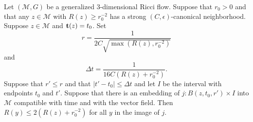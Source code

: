 \begin{lemma}
\label{lem:curvature-control-canonical-nbhd}
\label{controlnbhd}
Let $({\mathcal M},G)$ be a generalized $3$-dimensional Ricci flow.
Suppose that $r_0>0$ and that any $z\in {\mathcal M}$ with $R(z)\ge
r_0^{-2}$ has a strong $(C,\epsilon)$-canonical
neighborhood. Suppose $z\in
{\mathcal M}$ and ${\bf t}(z)=t_0$. Set
$$r=\frac{1}{2C\sqrt{\max(R(z),r_0^{-2})}}$$ and
$$\Delta t=\frac{1}{16C\left(R(z)+r_0^{-2}\right)}.$$
Suppose that $r'\le r$ and that $|t'-t_0|\le \Delta t$ and let $I$
be the interval with endpoints $t_0$ and $t'$. Suppose that there is
an embedding of $j\colon B(z,t_0,r')\times I$ into ${\mathcal M}$
compatible with time and with the vector field. Then $R(y)\le
2\left(R(z)+r_0^{-2}\right)$ for all $y$ in the image of $j$.
\end{lemma}

